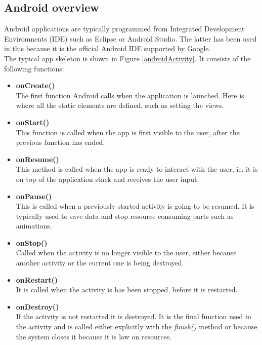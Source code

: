 \subsection{Android overview}

Android applications are typically programmed from Integrated Development Environments (IDE) such as  Eclipse or Android Studio. The latter has been used in this because it is the official Android IDE supported by Google. \\

The typical app skeleton is shown in Figure \ref{androidActivity}. It consists of the following functions:

	\begin{itemize}

	\item \textbf{onCreate()} \hfill \\
	The first function Android calls when the application is launched. Here is where all the static elements are defined, such as setting the views.
	
	\item \textbf{onStart()} \hfill \\
	This function is called when the app is first visible to the user, after the previous function has ended.


	\item \textbf{onResume()} \hfill \\
	This method is called when the app is ready to interact with the user, ie. it is on top of the application stack and receives the user input.

	\item \textbf{onPause()} \hfill \\
	This is called when a previously started activity is going to be resumed. It is typically used to save data and stop resource consuming parts such as animations.

	\item \textbf{onStop()} \hfill \\
	Called when the activity is no longer visible to the user, either because another activity or the current one is being destroyed.

	\item \textbf{onRestart()} \hfill \\
	It is called when the activity is has been stopped, before it is restarted.

	\item \textbf{onDestroy()} \hfill \\
	If the activity is not restarted it is destroyed. It is the final function used in the activity and is called either explicitly with the \textit{finish()} method or because the system closes it because it is low on resources.


	\end{itemize}
	\bigskip
	
